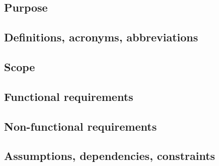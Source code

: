 \subsection{Purpose}


\subsection{Definitions, acronyms, abbreviations}


\subsection{Scope}


\subsection{Functional requirements}


\subsection{Non-functional requirements}


\subsection{Assumptions, dependencies, constraints}